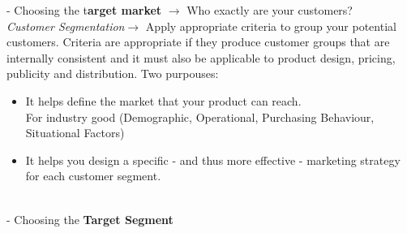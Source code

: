 \documentclass[11pt,a4paper]{article}
\begin{document}
- Choosing the t\textbf{arget market} $\to$ Who exactly are your customers?\\
\hspace{3cm} \emph{Customer Segmentation}$\to$ Apply appropriate criteria to group your potential customers. Criteria are appropriate if they produce customer groups that are internally consistent and it must also be applicable to product design, pricing, publicity and distribution. Two purpouses:
\begin{itemize}
\item It helps define the market that your product can reach.\\
\hspace{3cm} For industry good (Demographic, Operational, Purchasing Behaviour, Situational Factors)
\item It helps you design a specific - and thus more effective - marketing strategy for each customer segment.\\ \\
\end{itemize}

- Choosing the \textbf{Target Segment}

\end{document}
